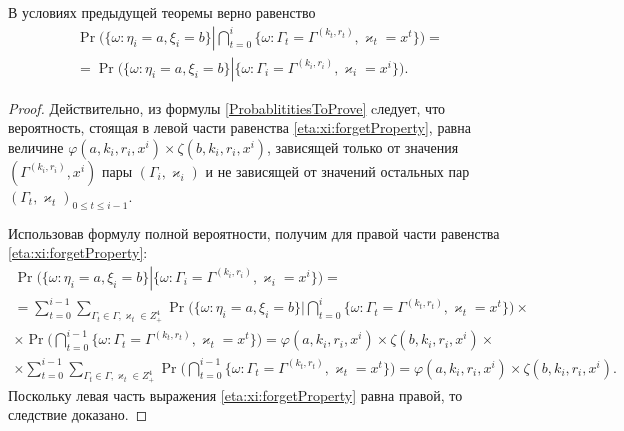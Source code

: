 \begin{corollary}\label{eta:xi:forget}
В условиях предыдущей теоремы верно равенство
\begin{multline}
\Pr \biggl(\{ \omega \colon \eta_i = a,   \xi_i=b\} \left|\bigcap_{t=0}^{i}\{\omega\colon \Gamma_t=\Gamma^{(k_t,  r_t)},   \varkappa_t=x^t\}\right.\biggr)=\\
=\Pr \biggl(\{ \omega \colon \eta_i = a,   \xi_i=b\} \left|\{\omega\colon \Gamma_i=\Gamma^{(k_i,  r_i)},   \varkappa_i=x^i\}\right.\biggr).
\label{eta:xi:forgetProperty}
\end{multline}
\end{corollary}
\begin{proof}
Действительно,   из формулы \eqref{ProbablititiesToProve} cледует,   что вероятность,   стоящая в левой части равенства \eqref{eta:xi:forgetProperty},  равна величине $\varphi(a,  k_i,  r_i,  x^i)\times \zeta(b,  k_i,  r_i,  x^i)$,   зависящей только от значения $(\Gamma^{(k_i,  r_i)},  x^i)$ пары $(\Gamma_i,  \varkappa_i)$ и не зависящей от значений остальных пар $(\Gamma_t,  \varkappa_t)_{0\leqslant t \leqslant i-1}$. 

Использовав формулу полной вероятности,   получим для правой части равенства \eqref{eta:xi:forgetProperty}:
\begin{multline*}
 \Pr \biggl(\{ \omega \colon \eta_i = a,  \xi_i=b\} \left|\{\omega\colon \Gamma_i=\Gamma^{(k_i,  r_i)},   \varkappa_i=x^i\}\right.\biggr) = \\ = \sum_{t=0}^{i-1}\sum_{\Gamma_t\in \Gamma,   \varkappa_t \in Z^4_+}\Pr \biggl(\{ \omega \colon \eta_i = a,   \xi_i=b\} \biggl|\bigcap_{t=0}^{i}\{\omega\colon \Gamma_t=\Gamma^{(k_t,  r_t)},   \varkappa_t=x^t\}\biggr) \times \\ \times \Pr \biggl(\bigcap_{t=0}^{i-1}\{ \omega \colon  \Gamma_t=\Gamma^{(k_t,  r_t)},   \varkappa_t=x^t\}\biggr) = 
 \varphi(a,  k_i,  r_i,  x^i)\times \zeta(b,  k_i,  r_i,  x^i) \times \\ \times \sum_{t=0}^{i-1}\sum_{\Gamma_t\in \Gamma,   \varkappa_t \in Z^4_+}\Pr \biggl(\bigcap_{t=0}^{i-1}\{ \omega \colon  \Gamma_t=\Gamma^{(k_t,   r_t)},   \varkappa_t=x^t\}\biggr) =\varphi(a,  k_i,  r_i,  x^i)\times \zeta(b,  k_i,  r_i,  x^i).
\end{multline*}
Поскольку левая часть выражения \eqref{eta:xi:forgetProperty} равна правой,   то следствие доказано. 
\end{proof}


